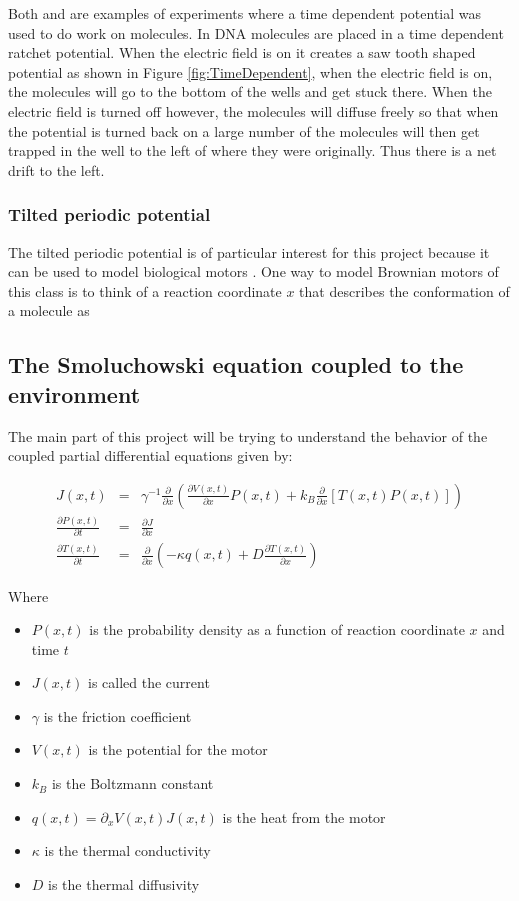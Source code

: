 \documentclass[11pt]{article} %
\begin{document}
Both \cite{JoelBader1999} and \cite{BlickleBechinger2011} are examples of experiments where a time dependent potential was used to do work on molecules. In \cite{JoelBader1999} DNA molecules are placed in a time dependent ratchet potential. When the electric field is on it creates a saw tooth shaped potential as shown in Figure \ref{fig:TimeDependent}, when the electric field is on, the molecules will go to the bottom of the wells and get stuck there. When the electric field is turned off however, the molecules will diffuse freely so that when the potential is turned back on a large number of the molecules will then get trapped in the well to the left of where they were originally. Thus there is a net drift to the left.

\subsubsection{Tilted periodic potential}
The tilted periodic potential is of particular interest for this project because it can be used to model biological motors \cite{Leibler1993,Magnasco1994}. One way to model Brownian motors of this class is to think of a reaction coordinate $x$ that describes the conformation of a molecule as

\subsection{The Smoluchowski equation coupled to the environment} \label{Smoluchowski}

The main part of this project will be trying to understand the behavior of the coupled partial differential equations given by:

\begin{eqnarray}
J(x, t) &=& \gamma^{-1} \frac{\partial}{\partial x} \left ( \frac{\partial V(x, t)}{\partial x} P(x, t) + k_B \frac{\partial}{\partial x} \left [T(x, t) P(x, t) \right] \right )  \\
\frac{\partial P(x, t)}{\partial t} &=& \frac{\partial J}{\partial x} \label{eqn:Smoluchowski} \\
\frac{\partial T(x, t)}{\partial t} &=& \frac{\partial}{\partial x} \left ( -\kappa q(x, t) + D \frac{\partial T(x, t)}{\partial x} \right ) \label{eqn:TemperatureEvolution}
\end{eqnarray}

Where
\begin{itemize}
\item{$P(x, t)$ is the probability density as a function of  reaction coordinate $x$ and time $t$}
\item{$J(x, t)$ is called the current}
\item{$\gamma$ is the friction coefficient}
\item{$V(x, t)$ is the potential for the motor}
\item{$k_B$ is the Boltzmann constant}
\item{$q(x, t) = \partial_x V(x, t) J(x, t)$ is the heat from the motor}
\item{$\kappa$ is the thermal conductivity}
\item{$D$ is the thermal diffusivity}
\end{itemize}
\end{document}
